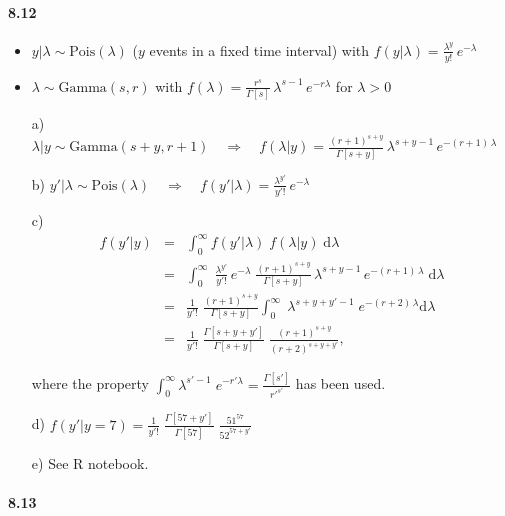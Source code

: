 \documentclass[fontsize=11pt,DIV=18,parskip=half]{scrartcl}
\begin{document}
\paragraph{8.12}

\begin{itemize}
\item $y|\lambda \sim \text{Pois}(\lambda)$ ($y$ events in a fixed time interval) with $f(y|\lambda) = \displaystyle{\frac{\lambda^y}{y!} \, e^{-\lambda}}$
\item $\lambda \sim \text{Gamma}(s,r)$ with $f(\lambda) = \displaystyle{\frac{r^s}{\Gamma[s]} \, \lambda^{s-1} \, e^{-r\lambda}}$ for $\lambda>0$
\end{itemize}

\begin{enumerate}
\item[a)] $\lambda|y \sim \text{Gamma}(s+y, r+1) \quad \Rightarrow \quad f(\lambda|y) = \displaystyle{\frac{(r+1)^{s+y}}{\Gamma[s+y]} \, \lambda^{s+y-1} \, e^{-(r+1)\,\lambda}}$
\item[b)] $y'|\lambda \sim \text{Pois}(\lambda) \quad \Rightarrow \quad f(y'|\lambda) = \displaystyle{\frac{\lambda^{y'}}{y'!} \, e^{-\lambda}}$
\item[c)]
\begin{eqnarray*}
f(y'|y) &=& \int_0^\infty f(y'|\lambda) \; f(\lambda|y) \; \text{d}\lambda \\
&=& \int_0^\infty \; \frac{\lambda^{y'}}{y'!} \, e^{-\lambda} \; \frac{(r+1)^{s+y}}{\Gamma[s+y]} \, \lambda^{s+y-1} \, e^{-(r+1)\,\lambda} \;  \text{d}\lambda \\
&=& \frac{1}{y'!} \; \frac{(r+1)^{s+y}}{\Gamma[s+y]}  \int_0^\infty \; \lambda^{s+y+y'-1} \; e^{-(r+2)\,\lambda}  \text{d}\lambda \\
&=& \frac{1}{y'!} \; \frac{\Gamma[s+y+y']}{\Gamma[s+y]} \; \frac{(r+1)^{s+y}}{(r+2)^{s+y+y'}},
\end{eqnarray*}

where the property $\displaystyle{\int_0^\infty} \lambda^{s'-1} \; e^{-r' \lambda} = \frac{\Gamma[s']}{{r'}^{s'}}$ has been used.
\item[d)] $f(y'|y=7) = \displaystyle{\frac{1}{y'!} \; \frac{\Gamma[57+y']}{\Gamma[57]} \; \frac{51^{57}}{52^{57+y'}}}$
\item[e)] See R notebook.
\end{enumerate}


\paragraph{8.13}
\end{document}
